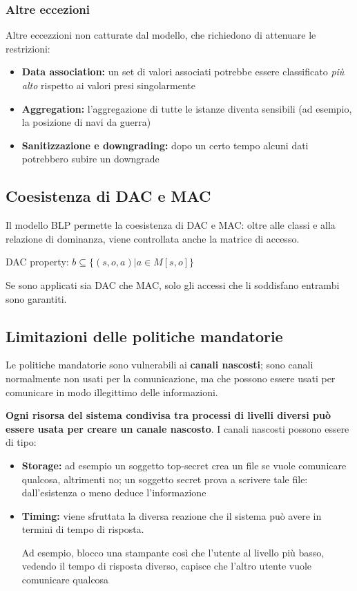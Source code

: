 \documentclass{report}
\begin{document}
\subsubsection{Altre eccezioni}
\noindent Altre eccezzioni non catturate dal modello, che richiedono di attenuare 
le restrizioni:
\begin{itemize}
    \item \textbf{Data association:} un set di valori associati potrebbe essere classificato 
    \textit{più alto} rispetto ai valori presi singolarmente 
    \item \textbf{Aggregation:} l'aggregazione di tutte le istanze diventa sensibili (ad esempio,
    la posizione di navi da guerra)
    \item \textbf{Sanitizzazione e downgrading:} dopo un certo tempo alcuni dati potrebbero 
    subire un downgrade
\end{itemize}


\subsection{Coesistenza di DAC e MAC}
Il modello BLP permette la coesistenza di DAC e MAC: oltre alle classi e 
alla relazione di dominanza, viene controllata anche la matrice di accesso.
\begin{center}
    DAC property: $b \subseteq \{(s,o,a) | a \in M[s,o]\}$
\end{center}

\noindent Se sono applicati sia DAC che MAC, solo gli accessi che li soddisfano entrambi 
sono garantiti.

\subsection{Limitazioni delle politiche mandatorie}
Le politiche mandatorie sono vulnerabili ai \textbf{canali nascosti}; sono 
canali normalmente non usati per la comunicazione, ma che possono essere usati per 
comunicare in modo illegittimo delle informazioni.

\noindent \textbf{Ogni risorsa del sistema condivisa tra processi di livelli diversi 
può essere usata per creare un canale nascosto}. I canali nascosti possono essere di tipo:
\begin{itemize}
    \item \textbf{Storage:} ad esempio un soggetto top-secret crea un file se vuole comunicare 
    qualcosa, altrimenti no; un soggetto secret prova a scrivere tale file: dall'esistenza o meno 
    deduce l'informazione 
    \item \textbf{Timing:} viene sfruttata la diversa reazione che il sistema può avere in 
    termini di tempo di risposta. 
    
    \noindent Ad esempio, blocco una stampante così che l'utente al livello più basso,
    vedendo il tempo di risposta diverso, capisce che l'altro utente vuole comunicare qualcosa
\end{itemize}
\end{document}
